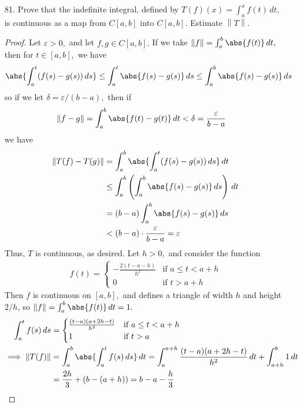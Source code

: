 \documentclass{article}
\begin{document}
\begin{itemize}
	\item[81.] Prove that the indefinite integral, defined by $T(f)(x)=\int_a^x f(t)\, dt,$ is continuous as a map from $C[a, b]$ into $C[a, b].$ Estimate $\left\lVert T \right\rVert.$
		\begin{proof}
			Let $\varepsilon>0,$ and let $f, g\in C[a, b].$ If we take $\left\lVert f \right\rVert = \int_a^b \abs{f(t)}\, dt,$ then for $t\in[a, b],$ we have
			\begin{align*}
				\abs{\int_a^t (f(s)-g(s))\, ds} &\le \int_a^t \abs{f(s)-g(s)}\, ds \le \int_a^b \abs{f(s)-g(s)}\, ds
			\end{align*}
			so if we let $\delta = \varepsilon/(b-a),$ then if
			\begin{align*}
				\left\lVert f-g \right\rVert &= \int_a^b \abs{f(t)-g(t)}\, dt < \delta = \frac{\varepsilon}{b-a}
			\end{align*}
			we have
			\begin{align*}
				\left\lVert T(f)-T(g) \right\rVert &= \int_a^b \abs{\int_a^t (f(s)-g(s))\, ds}\, dt \\
				&\le \int_a^b \left( \int_a^b \abs{f(s)-g(s)}\, ds \right)\, dt \\
				&= (b-a) \int_a^b \abs{f(s)-g(s)}\, ds \\
				&< (b-a)\cdot \frac{\varepsilon}{b-a} = \varepsilon
			\end{align*}
			Thus, $T$ is continuous, as desired. Let $h>0,$ and consider the function
			\begin{align*}
				f(t) = \begin{cases}
					-\frac{2(t-a-h)}{h^2} & \text{if } a\le t<a+ h \\
					0 & \text{if } t > a+h
				\end{cases}
			\end{align*}
			Then  $f$ is continuous on $[a, b],$ and defines a triangle of width $h$ and height $2/h$, so $\left\lVert f \right\rVert = \int_a^b \abs{f(t)}\, dt = 1.$ 
			\begin{align*}
				\int_a^t f(s)\, ds &= \begin{cases}
					\frac{(t-a)(a+2h-t)}{h^2} & \text{if } a\le t<a+h \\
					1 & \text{if } t>a
				\end{cases} \\
				\implies\left\lVert T(f) \right\rVert &= \int_a^b \abs{\int_a^t f(s)\, ds}\, dt = \int_a^{a+h} \frac{(t-a)(a+2h-t)}{h^2}\, dt + \int_{a+h}^b 1\, dt \\
				&= \frac{2h}{3} + (b-(a+h)) = b-a-\frac{h}{3}

\end{align*}
\end{proof}
\end{itemize}
\end{document}
